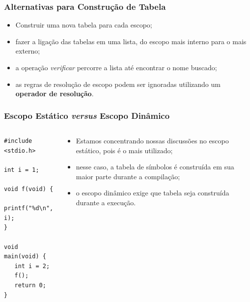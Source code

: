 \documentclass[table]{beamer}
\begin{document}
\begin{frame}
   \frametitle{Alternativas para Construção de Tabela}
   \begin{itemize}
      \item Construir uma nova tabela para cada escopo;
      \item fazer a ligação das tabelas em uma lista, do escopo mais interno para o mais externo;
      \item a operação \textit{verificar} percorre a lista até encontrar o nome buscado;
      \item as regras de resolução de escopo podem ser ignoradas utilizando um \textbf{operador de resolução}.
   \end{itemize}
\end{frame}

\begin{frame}[fragile]
   \frametitle{Escopo Estático \textit{versus} Escopo Dinâmico}
   \begin{columns}
   \begin{column}{0.5\textwidth}
   \begin{verbatim}
#include <stdio.h>

int i = 1;

void f(void) {
   printf("%d\n", i);
}

void main(void) {
   int i = 2;
   f();
   return 0;
}
   \end{verbatim}
   \end{column}
   \begin{column}{0.5\textwidth}
   \begin{itemize}
      \item Estamos concentrando nossas discussões no escopo estático, pois é o mais utilizado;
      \item nesse caso, a tabela de símbolos é construída em sua maior parte durante a compilação;
      \item o escopo dinâmico exige que tabela seja construída durante a execução.
   \end{itemize}
   \end{column}
   \end{columns}
\end{frame}
\end{document}
